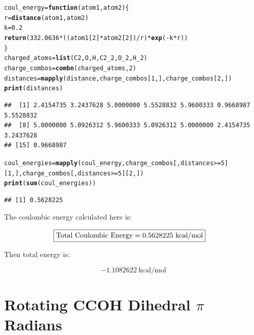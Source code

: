 \documentclass{article}\usepackage[]{graphicx}\usepackage[]{color}
\makeatletter
\newcommand{\hlnum}[1]{\textcolor[rgb]{0.686,0.059,0.569}{#1}}%
\newcommand{\hlopt}[1]{\textcolor[rgb]{0,0,0}{#1}}%
\newcommand{\hlstd}[1]{\textcolor[rgb]{0.345,0.345,0.345}{#1}}%
\newcommand{\hlkwa}[1]{\textcolor[rgb]{0.161,0.373,0.58}{\textbf{#1}}}%
\newcommand{\hlkwb}[1]{\textcolor[rgb]{0.69,0.353,0.396}{#1}}%
\newcommand{\hlkwc}[1]{\textcolor[rgb]{0.333,0.667,0.333}{#1}}%
\newcommand{\hlkwd}[1]{\textcolor[rgb]{0.737,0.353,0.396}{\textbf{#1}}}%
\newenvironment{kframe}{%
 \def\at@end@of@kframe{}%
 \ifinner\ifhmode%
  \def\at@end@of@kframe{\end{minipage}}%
  \begin{minipage}{\columnwidth}%
 \fi\fi%
 \def\FrameCommand##1{\hskip\@totalleftmargin \hskip-\fboxsep
 \colorbox{shadecolor}{##1}\hskip-\fboxsep
     \hskip-\linewidth \hskip-\@totalleftmargin \hskip\columnwidth}%
 \MakeFramed {\advance\hsize-\width
   \@totalleftmargin\z@ \linewidth\hsize
   \@setminipage}}%
 {\par\unskip\endMakeFramed%
 \at@end@of@kframe}
\newenvironment{knitrout}{}{} %
\makeatother
\begin{document}
\begin{knitrout}
\color{fgcolor}\begin{kframe}
\begin{alltt}
  \hlstd{coul_energy}\hlkwb{=}\hlkwa{function}\hlstd{(}\hlkwc{atom1}\hlstd{,}\hlkwc{atom2}\hlstd{)\{}
    \hlstd{r}\hlkwb{=}\hlkwd{distance}\hlstd{(atom1,atom2)}
    \hlstd{k}\hlkwb{=}\hlnum{0.2}
    \hlkwd{return}\hlstd{(}\hlnum{332.0636}\hlopt{*}\hlstd{((atom1[}\hlnum{2}\hlstd{]}\hlopt{*}\hlstd{atom2[}\hlnum{2}\hlstd{])}\hlopt{/}\hlstd{r)}\hlopt{*}\hlkwd{exp}\hlstd{(}\hlopt{-}\hlstd{k}\hlopt{*}\hlstd{r))}
  \hlstd{\}}
  \hlstd{charged_atoms} \hlkwb{=} \hlkwd{list}\hlstd{(C2,O,H,C2_2,O_2,H_2)}
  \hlstd{charge_combos} \hlkwb{=} \hlkwd{combn}\hlstd{(charged_atoms,}\hlnum{2}\hlstd{)}
  \hlstd{distances}\hlkwb{=}\hlkwd{mapply}\hlstd{(distance,charge_combos[}\hlnum{1}\hlstd{,],charge_combos[}\hlnum{2}\hlstd{,])}
  \hlkwd{print}\hlstd{(distances)}
\end{alltt}
\begin{verbatim}
##  [1] 2.4154735 3.2437628 5.0000000 5.5528832 5.9600333 0.9668987 5.5528832
##  [8] 5.0000000 5.0926312 5.9600333 5.0926312 5.0000000 2.4154735 3.2437628
## [15] 0.9668987
\end{verbatim}
\begin{alltt}
  \hlstd{coul_energies} \hlkwb{=} \hlkwd{mapply}\hlstd{(coul_energy,charge_combos[,distances}\hlopt{>=}\hlnum{5}\hlstd{][}\hlnum{1}\hlstd{,],charge_combos[,distances}\hlopt{>=}\hlnum{5}\hlstd{][}\hlnum{2}\hlstd{,])}
  \hlkwd{print}\hlstd{(}\hlkwd{sum}\hlstd{(coul_energies))}
\end{alltt}
\begin{verbatim}
## [1] 0.5628225
\end{verbatim}
\end{kframe}
\end{knitrout}

The coulombic energy calculated here is:

\begin{align*}
  \Aboxed{\text{Total Coulombic Energy}=0.5628225\ \text{kcal/mol}}
\end{align*}

Then total energy is:

$$-1.1082622\ \text{kcal/mol}$$



\section{Rotating CCOH Dihedral $\pi$ Radians}
\end{document}
